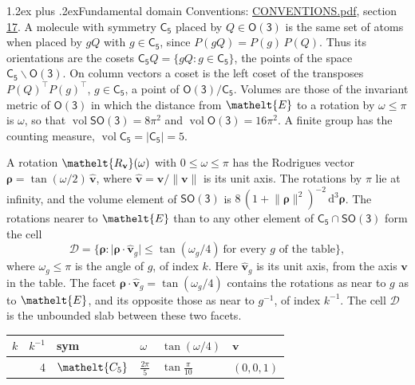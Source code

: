 \documentclass[10pt,a4paper]{article}
\makeatletter
\renewcommand\section{\@startsection{section}{1}{\z@}{-3ex plus -1ex minus -.2ex}%
  {1.2ex plus .2ex}{\normalfont\large\sffamily\bfseries\color{parttitle}}}
\numberwithin{equation}{section}
\newcommand{\eltfont}[1]{{\let\sigma\eltsigma\mathelt{#1}}}
\newcommand{\grp}[1]{\mathsf{#1}}
\newcommand{\cls}[1]{\eltfont{#1}}
\newcommand{\elt}[1]{\eltfont{#1}}
\newcommand{\dirvec}[3]{(#1, #2, #3)}
\newcommand{\unitaxis}{\hat{\mathbf{v}}}
\newcommand{\vv}{\mathbf{v}}
\newcommand{\diff}{\mathrm{d}}
\newcommand{\vol}{\operatorname{vol}}
\newcommand{\rodrigues}{\boldsymbol{\rho}}
\newcommand{\fcell}{\mathcal{D}}
\makeatother
\begin{document}
\section{Fundamental domain}\label{s:fundamental_domain}
Conventions: \href{../../CONVENTIONS.pdf}{CONVENTIONS.pdf}, section \href{../../CONVENTIONS.pdf\#conv.17}{17}.
\leavevmode\label{n:element.placement}A molecule with symmetry $\grp{C_{5}}$ placed by $Q \in \grp{O(3)}$ is the same set of atoms when placed by $gQ$ with $g \in \grp{C_{5}}$, since $P(gQ) = P(g)\,P(Q)$. \label{n:operator.cosets}Thus its orientations are the cosets $\grp{C_{5}}Q = \{gQ : g \in \grp{C_{5}}\}$, the points of the space $\grp{C_{5}}\backslash\grp{O(3)}$. On column vectors a coset is the left coset of the transposes $P(Q)^{\top}P(g)^{\top}$, $g \in \grp{C_{5}}$, a point of $\grp{O(3)}/\grp{C_{5}}$.
\leavevmode\label{n:operator.volume}Volumes are those of the invariant metric of \href{O3.pdf}{$\grp{O(3)}$} in which the distance from $\elt{E}$ to a rotation by $\omega \le \pi$ is $\omega$, so that $\vol\grp{SO(3)} = 8\pi^2$ and $\vol\grp{O(3)} = 16\pi^2$. A finite group has the counting measure, $\vol\grp{C_{5}} = |\grp{C_{5}}| = 5$.

\leavevmode\label{n:vector.rodrigues}\label{n:vector.unitaxis}A rotation $\elt{R_{\vv}}(\omega)$ with $0 \le \omega \le \pi$ has the Rodrigues vector $\rodrigues = \tan(\omega/2)\,\unitaxis$, where $\unitaxis = \vv/\lVert\vv\rVert$ is its unit axis. The rotations by $\pi$ lie at infinity, and the volume element of \href{SO3.pdf}{$\grp{SO(3)}$} is $8\,(1 + \lVert\rodrigues\rVert^2)^{-2}\,\diff^3\rodrigues$.
\leavevmode\label{n:set.cell}The rotations nearer to $\elt{E}$ than to any other element of $\grp{C_{5}} \cap \grp{SO(3)}$ form the cell
\begin{equation}\label{e:cell}\fcell = \bigl\{\rodrigues : \lvert\rodrigues\cdot\unitaxis_g\rvert \le \tan(\omega_g/4)\ \text{for every $g$ of the table}\bigr\},\end{equation}
where $\omega_g \le \pi$ is the angle of $g$, of index $k$. Here $\unitaxis_g$ is its unit axis, from the axis $\vv$ in the table. The facet $\rodrigues\cdot\unitaxis_g = \tan(\omega_g/4)$ contains the rotations as near to $g$ as to $\elt{E}$, and its opposite those as near to $g^{-1}$, of index $k^{-1}$. The cell $\fcell$ is the unbounded slab between these two facets.
{\small{\renewcommand{\arraystretch}{1.3}\begin{longtable}{@{}rrllll@{}}\toprule
$k$ & $k^{-1}$ & sym & $\omega$ & $\tan(\omega/4)$ & $\vv$\\\midrule\endhead
\bottomrule\endfoot\endlastfoot
1 & 4 & $\cls{C_{5}}$ & $\tfrac{2\pi}{5}$ & $\tan\tfrac{\pi}{10}$ & $\dirvec{0}{0}{1}$\\
\bottomrule\end{longtable}}}
\end{document}
